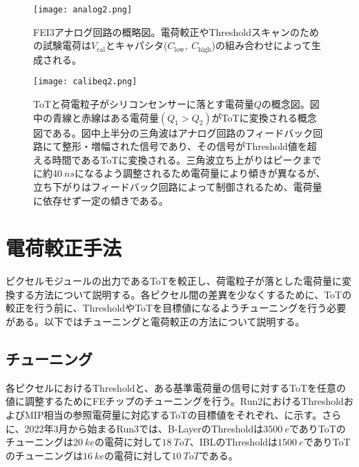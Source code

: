 \begin{figure}[tbp]
  \centering
  \texttt{[image: analog2.png]}
  \caption[FEI3アナログ回路の概略図]{FEI3アナログ回路の概略図。電荷較正やThresholdスキャンのための試験電荷は$V_\mathrm{cal}$とキャパシタ($C_\mathrm{low},\ C_\mathrm{high}$)の組み合わせによって生成される。}
  \label{fig:analog}
\end{figure}

\begin{figure}[tbp]
  \centering
  \texttt{[image: calibeq2.png]}
  \caption[ToTと荷電粒子がシリコンセンサーに落とす電荷量$Q$の概念図]{ToTと荷電粒子がシリコンセンサーに落とす電荷量$Q$の概念図。図中の青線と赤線はある電荷量$(Q_1>Q_2)$がToTに変換される概念図である。図中上半分の三角波はアナログ回路のフィードバック回路にて整形・増幅された信号であり、その信号がThreshold値を超える時間であるToTに変換される。三角波立ち上がりはピークまでに約$40\ \si{ns}$になるよう調整されるため電荷量により傾きが異なるが、立ち下がりはフィードバック回路によって制御されるため、電荷量に依存せず一定の傾きである。}
  \label{fig:sannkakuha}
\end{figure}



\section{電荷較正手法}
\label{sec:calibway}
ピクセルモジュールの出力であるToTを較正し、荷電粒子が落とした電荷量に変換する方法について説明する。各ピクセル間の差異を少なくするために、ToTの較正を行う前に、ThresholdやToTを目標値になるようチューニングを行う必要がある。以下ではチューニングと電荷較正の方法について説明する。


\subsection{チューニング}
\label{sec:tuning}
各ピクセルにおけるThresholdと、ある基準電荷量の信号に対するToTを任意の値に調整するためにFEチップのチューニングを行う。Run2におけるThresholdおよびMIP相当の参照電荷量に対応するToTの目標値をそれぞれ、に示す。さらに、2022年3月から始まるRun3では、B-LayerのThresholdは$3500\ \si{e}$でありToTのチューニングは$20\ \si{ke}$の電荷に対して$18\ \si{ToT}$、IBLのThresholdは$1500\ \si{e}$でありToTのチューニングは$16\ \si{ke}$の電荷に対して$10\ \si{ToT}$である。

